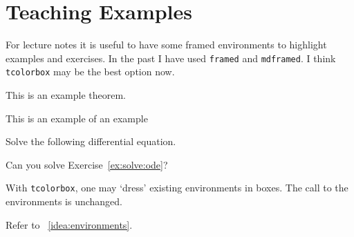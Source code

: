 
\section{Teaching Examples}

For lecture notes it is useful to have some framed environments to highlight examples and exercises. In the past I have used \texttt{framed} and \texttt{mdframed}. I think \texttt{tcolorbox} may be the best option now.


\begin{theorem}
This is an example theorem.
\end{theorem}

\begin{example}
This is an example of an example
\end{example}


\begin{exercise}
  Solve the following differential equation.
  \label{ex:solve:ode}
\end{exercise} 
\noindent Can you solve Exercise~\ref{ex:solve:ode}?


\begin{bigidea}[environments]
  With \texttt{tcolorbox}, one may `dress' existing environments in boxes. The call to the environments is unchanged.
  \label{idea:environments}
\end{bigidea} 
\noindent Refer to \bigidearef{}~\ref{idea:environments}.